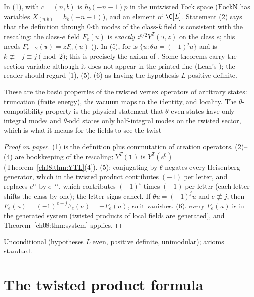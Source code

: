 \begin{dictionary}
In (1),  with $c=(n,b)$ is $h_b(-n-1)p$ in the untwisted Fock space
($\mathrm{FockN}$ has variables $X_{(n,b)}=h_b(-n-1)$), and  an
element of $\C[L]$.  Statement (2) says that the definition through $0$-th modes of the class-$k$
field is consistent with the rescaling: the class-$e$ field $F_e(u)$ is \emph{exactly}
$z^{e/2}Y^T(u,z)$ on the class $e$; this needs $F_{e+2}(u)=zF_e(u)$ ().  In (5),
 for  is $\{u:\theta u=(-1)^ju\}$ and  is
$k\not\equiv -j\equiv j\pmod2$; this is precisely the  axiom of
.  Some theorems carry the section variable  although it does not
appear in the printed line (Lean's ); the reader should regard (1), (5), (6) as
having the hypothesis $L$ positive definite.
\end{dictionary}

\begin{physics}
These are the basic properties of the twisted vertex operators of arbitrary states: truncation (finite energy), the vacuum maps to the identity, and locality. The $\theta$-compatibility property is the physical statement that $\theta$-even states have only integral modes and $\theta$-odd states only half-integral modes on the twisted sector, which is what it means for the fields to see the twist.
\end{physics}
\begin{proof}[Proof on paper]
(1) is the definition plus commutation of creation operators.  (2)--(4) are bookkeeping of the
rescaling; $Y^T(\mathbf 1)$ is $Y^T(e^0)$ (Theorem~\ref{ch08:thm:YTL}(4)).  (5): conjugating by
$\theta$ negates every Heisenberg generator, which in the twisted product contributes $(-1)$ per
letter, and replaces $e^\alpha$ by $e^{-\alpha}$, which contributes $(-1)^{e}$ times $(-1)$ per
letter (each letter shifts the class by one); the letter signs cancel.  If $\theta u=(-1)^ju$ and
$e\not\equiv j$, then $F_e(u)=(-1)^{e+j}F_e(u)=-F_e(u)$, so it vanishes.  (6): every $F_e(u)$ is
in the generated system (twisted products of local fields are generated), and
Theorem~\ref{ch08:thm:system} applies.
\end{proof}
\begin{status}
Unconditional (hypotheses $L$ even, positive definite, unimodular); axioms standard.
\end{status}

\section{The twisted product formula}\label{ch08:sec:PF}

